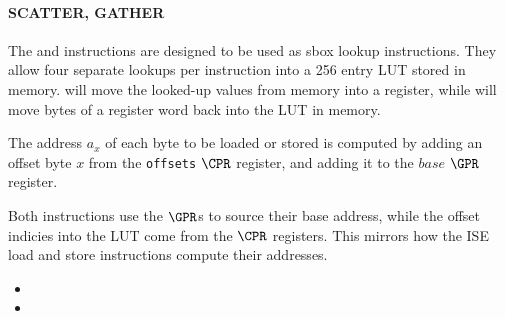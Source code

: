 
\paragraph{SCATTER, GATHER}

The  and  instructions are designed to be used as
sbox lookup instructions. They allow four separate lookups per instruction
into a 256 entry LUT stored in memory.  will move the looked-up
values from memory into a register, while  will move bytes of a
register word back into the LUT in memory.

The address $a_x$ of each byte to be loaded or stored is computed by
adding an offset byte $x$ from the {\tt offsets} $\CPR$ register, and
adding it to the $base$ $\GPR$ register.

Both instructions use the $\GPR$s to source their base address, while the
offset indicies into the LUT come from the $\CPR$ registers. This mirrors
how the ISE load and store instructions compute their addresses.

\begin{itemize}
\item {}
\item {}
\end{itemize}


